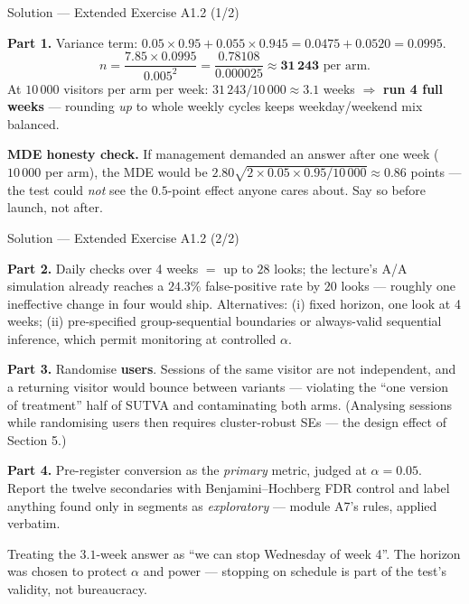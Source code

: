 \documentclass[aspectratio=169,11pt]{beamer}
\begin{document}
\begin{frame}{Solution --- Extended Exercise A1.2 (1/2)}
\begin{solutionbox}
  \textbf{Part 1.} Variance term:
  $0.05\times0.95 + 0.055\times0.945 = 0.0475 + 0.0520 = 0.0995$.
  \[
    n = \frac{7.85 \times 0.0995}{0.005^2}
      = \frac{0.78108}{0.000025} \approx \mathbf{31\,243} \text{ per arm}.
  \]
  At $10\,000$ visitors per arm per week: $31\,243/10\,000 \approx 3.1$ weeks
  $\Rightarrow$ \textbf{run 4 full weeks} --- rounding \emph{up} to whole weekly cycles
  keeps weekday/weekend mix balanced.

  \smallskip
  \textbf{MDE honesty check.} If management demanded an answer after one week
  ($10\,000$ per arm), the MDE would be
  $2.80\sqrt{2 \times 0.05 \times 0.95 / 10\,000} \approx 0.86$ points --- the test
  could \emph{not} see the $0.5$-point effect anyone cares about. Say so before launch,
  not after.
\end{solutionbox}
\end{frame}

\begin{frame}{Solution --- Extended Exercise A1.2 (2/2)}
\begin{solutionbox}
  \scriptsize
  \textbf{Part 2.} Daily checks over 4 weeks $=$ up to $28$ looks; the lecture's A/A
  simulation already reaches a $\mathbf{24.3\%}$ false-positive rate by $20$ looks ---
  roughly one ineffective change in four would ship. Alternatives: (i) fixed horizon,
  one look at 4 weeks; (ii) pre-specified group-sequential boundaries or always-valid
  sequential inference, which permit monitoring at controlled $\alpha$.

  \smallskip
  \textbf{Part 3.} Randomise \textbf{users}. Sessions of the same visitor are not
  independent, and a returning visitor would bounce between variants --- violating the
  ``one version of treatment'' half of SUTVA and contaminating both arms. (Analysing
  sessions while randomising users then requires cluster-robust SEs --- the design
  effect of Section 5.)

  \smallskip
  \textbf{Part 4.} Pre-register conversion as the \emph{primary} metric, judged at
  $\alpha=0.05$. Report the twelve secondaries with Benjamini--Hochberg FDR control and
  label anything found only in segments as \emph{exploratory} --- module A7's rules,
  applied verbatim.
\end{solutionbox}
\begin{mistake}
  Treating the $3.1$-week answer as ``we can stop Wednesday of week 4''. The horizon
  was chosen to protect $\alpha$ and power --- stopping on schedule is part of the
  test's validity, not bureaucracy.
\end{mistake}
\end{frame}
\end{document}
